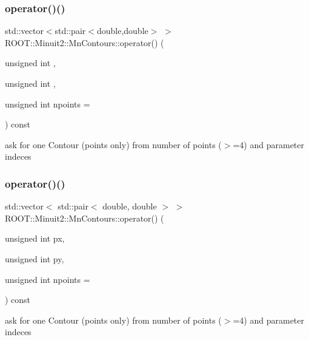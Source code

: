 \subsubsection{\texorpdfstring{operator()()}{operator()()}\hspace{0.1cm}{\footnotesize\ttfamily [1/3]}}
{\footnotesize\ttfamily std\+::vector$<$std\+::pair$<$double,double$>$ $>$ R\+O\+O\+T\+::\+Minuit2\+::\+Mn\+Contours\+::operator() (\begin{DoxyParamCaption}\item[{unsigned int}]{,  }\item[{unsigned int}]{,  }\item[{unsigned int}]{npoints = {} }\end{DoxyParamCaption}) const}



ask for one Contour (points only) from number of points ($>$=4) and parameter indeces 

\mbox{\label{classROOT_1_1Minuit2_1_1MnContours_a8a56508ee3dd6f22b7378acf8286debe}} 
\subsubsection{\texorpdfstring{operator()()}{operator()()}\hspace{0.1cm}{\footnotesize\ttfamily [2/3]}}
{\footnotesize\ttfamily std\+::vector$<$ std\+::pair$<$ double, double $>$ $>$ R\+O\+O\+T\+::\+Minuit2\+::\+Mn\+Contours\+::operator() (\begin{DoxyParamCaption}\item[{unsigned int}]{px,  }\item[{unsigned int}]{py,  }\item[{unsigned int}]{npoints = {} }\end{DoxyParamCaption}) const}



ask for one Contour (points only) from number of points ($>$=4) and parameter indeces 

